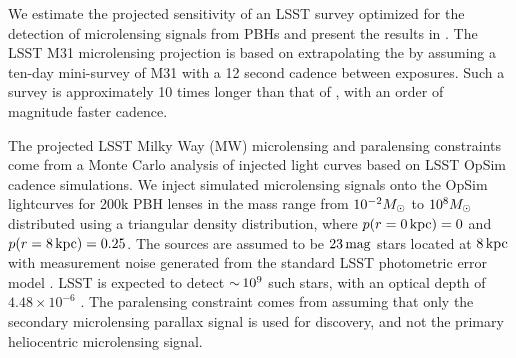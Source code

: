 
We estimate the projected sensitivity of an LSST survey optimized for the detection of microlensing signals from PBHs and present the results in .
The LSST M31 microlensing projection is based on extrapolating the \citet{1701.02151} by assuming a ten-day mini-survey of M31 with a 12 second cadence between exposures.
Such a survey is approximately 10 times longer than that of \citet{1701.02151}, with an order of magnitude faster cadence.

The projected LSST Milky Way (MW) microlensing and paralensing constraints come from a Monte Carlo analysis of injected light curves based on LSST OpSim cadence simulations.
We inject simulated microlensing signals onto the OpSim lightcurves for 200k PBH lenses in the mass range from $10^{-2}M_\odot$ to $10^{8}M_\odot$ distributed using a triangular density distribution, where $p(r = 0 \mathrm{\,kpc}) = 0$ and $p(r = 8\mathrm{\,kpc}) = 0.25$.
The sources are assumed to be $23\mathrm{\,mag}$ stars located at $8\mathrm{\,kpc}$ with measurement noise generated from the standard LSST photometric error model \citep{0805.2366}.
LSST is expected to detect $ {\sim}\, 10^{9}$ such stars, with an optical depth of $4.48 \times 10^{-6}$ \citep{2006ApJ...636..240S}.
The paralensing constraint comes from assuming that only the secondary microlensing parallax signal is used for discovery, and not the primary heliocentric microlensing signal.


